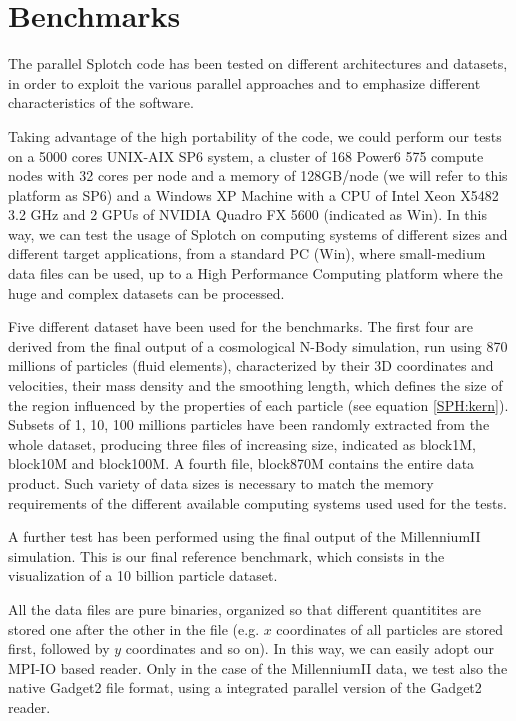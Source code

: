 \section{Benchmarks}

The parallel Splotch code has been tested on different architectures and datasets, in order to 
exploit the various parallel approaches and to emphasize different characteristics of the software.

Taking advantage of the high portability of the code, we could perform our tests on a 5000 cores UNIX-AIX 
SP6 system, a cluster of 168 Power6 575 compute nodes with 32 cores per node and a memory of 128GB/node
(we will refer to this platform as SP6) and a Windows XP Machine with a CPU of Intel Xeon X5482 3.2 GHz and
2 GPUs of NVIDIA Quadro FX 5600 (indicated as Win). 
In this way, we can test the usage of Splotch on computing systems 
of different sizes and different target applications, from a standard PC (Win), where small-medium
data files can be used, up to 
a High Performance Computing platform where the huge and complex datasets can be processed.

Five different dataset have been used for the benchmarks. The first four are derived from 
the final output of a cosmological N-Body simulation, run using 870 millions of particles 
(fluid elements), characterized by their 3D coordinates and velocities, their mass density 
and the smoothing length, which defines the size of the region influenced by the properties
of each particle (see equation \ref{SPH:kern}). Subsets of 1, 10, 100 millions particles have been
randomly extracted from the whole dataset, producing three files of increasing size, indicated as
block1M, block10M and block100M. A fourth file, block870M contains the entire data product. 
Such variety of data sizes is necessary to match the memory requirements of the different available 
computing systems used used for the tests.

A further test has been performed using the final output of the MillenniumII simulation. 
This is our final reference benchmark, which consists in the visualization of a 10 billion
particle dataset.

All the data files are pure binaries, organized so that different quantitites are stored one after
the other in the file (e.g. $x$ coordinates of all particles are stored first, followed by $y$ 
coordinates and so on). In this way, we can easily adopt our MPI-IO based
reader. Only in the case of the MillenniumII data, we test also the native 
Gadget2 \cite{gadget} file format, using a integrated parallel version of the Gadget2 reader.


